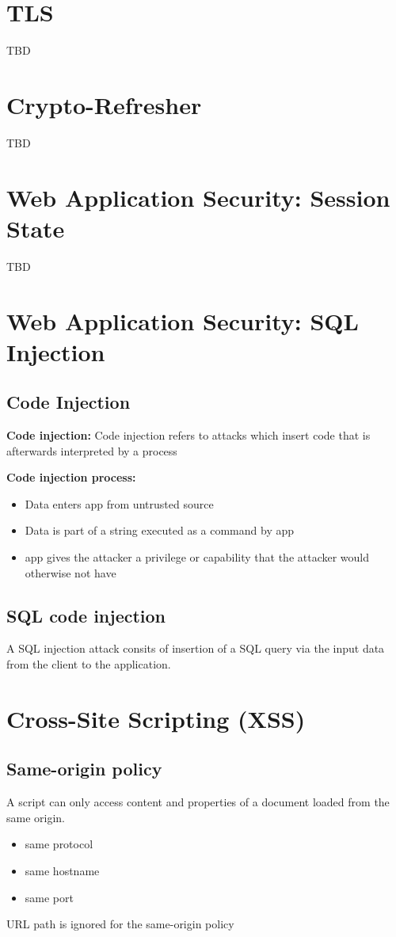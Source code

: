 \documentclass[fs, footer]{latex4ei}
\begin{document}
\begin{multicols*}{4}

\section{TLS}
TBD
\section{Crypto-Refresher}
TBD
\section{Web Application Security: Session State}
TBD
\section{Web Application Security: SQL Injection}

\subsection{Code Injection} 
\textbf{Code injection:} Code injection refers to attacks which insert code that is afterwards interpreted by a process

\textbf{Code injection process:}
\begin{itemize}
	\item Data enters app from untrusted source
	\item Data is part of a string executed as a command by app
	\item app gives the attacker a privilege or capability that the attacker would otherwise not have
\end{itemize}

\subsection{SQL code injection} 
A SQL injection attack consits of insertion of a SQL query via the input data from the client to the application.
\section{Cross-Site Scripting (XSS)}
\subsection{Same-origin policy}
A script can only access content and properties of a document loaded from the same origin.
\begin{itemize}
  \item same protocol
  \item same hostname
  \item same port
\end{itemize}
URL path is ignored for the same-origin policy


\end{multicols*}
\end{document}
